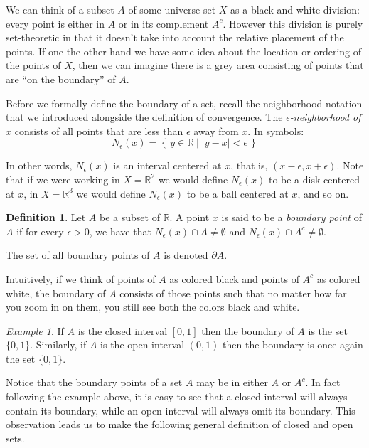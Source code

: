 \documentclass[11pt,oneside]{amsbook}
\newcommand{\set}[1]{\left\{\,#1\,\right\}}
\newcommand{\R}{\mathbb R}
\theoremstyle{definition}
\theoremstyle{plain}
\theoremstyle{definition}
\newtheorem{definition}[theorem]{Definition}
\theoremstyle{remark}
\newtheorem{example}[theorem]{Example}
\numberwithin{equation}{section}
\numberwithin{figure}{section}
\begin{document}
We can think of a subset $A$ of some universe set $X$ as a black-and-white division: every point is either in $A$ or in its complement $A^c$. However this division is purely set-theoretic in that it doesn't take into account the relative placement of the points. If one the other hand we have some idea about the location or ordering of the points of $X$, then we can imagine there is a grey area consisting of points that are ``on the boundary'' of $A$.

Before we formally define the boundary of a set, recall the neighborhood notation that we introduced alongside the definition of convergence. The \emph{$\epsilon$-neighborhood of $x$} consists of all points that are less than $\epsilon$ away from $x$. In symbols:
\[N_\epsilon(x)=\set{y\in\R\mid|y-x|<\epsilon}
\]

In other words, $N_\epsilon(x)$ is an interval centered at $x$, that is, $(x-\epsilon,x+\epsilon)$. Note that if we were working in $X=\R^2$ we would define $N_\epsilon(x)$ to be a disk centered at $x$, in $X=\R^3$ we would define $N_\epsilon(x)$ to be a ball centered at $x$, and so on.

\begin{definition}
  Let $A$ be a subset of $\R$. A point $x$ is said to be a \emph{boundary point} of $A$ if for every $\epsilon>0$, we have that $N_\epsilon(x)\cap A\neq\emptyset$ and $N_\epsilon(x)\cap A^c\neq\emptyset$.
  
  The set of all boundary points of $A$ is denoted $\partial A$.
\end{definition}

Intuitively, if we think of points of $A$ as colored black and points of $A^c$ as colored white, the boundary of $A$ consists of those points such that no matter how far you zoom in on them, you still see both the colors black and white.

\begin{example}
  If $A$ is the closed interval $[0,1]$ then the boundary of $A$ is the set $\{0,1\}$. Similarly, if $A$ is the open interval $(0,1)$ then the boundary is once again the set $\{0,1\}$.
\end{example}

Notice that the boundary points of a set $A$ may be in either $A$ or $A^c$. In fact following the example above, it is easy to see that a closed interval will always contain its boundary, while an open interval will always omit its boundary. This observation leads us to make the following general definition of closed and open sets.
\end{document}
